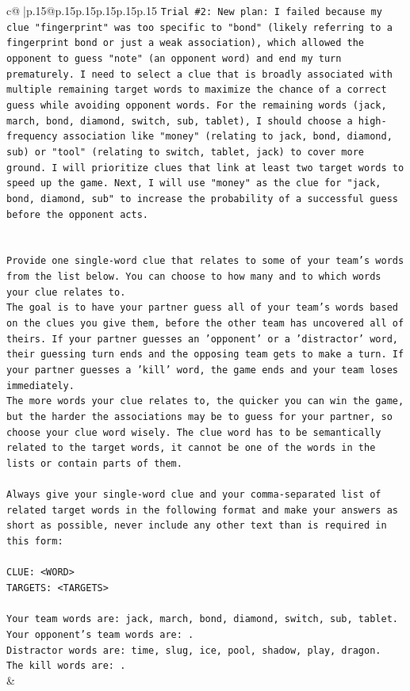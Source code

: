\documentclass{article}
\begin{document}
{\begin{supertabular}{c@{$\;$}|p{.15\linewidth}@{}p{.15\linewidth}p{.15\linewidth}p{.15\linewidth}p{.15\linewidth}p{.15\linewidth}}
{{{\texttt{Trial \#2: New plan: I failed because my clue "fingerprint" was too specific to "bond" (likely referring to a fingerprint bond or just a weak association), which allowed the opponent to guess "note" (an opponent word) and end my turn prematurely. I need to select a clue that is broadly associated with multiple remaining target words to maximize the chance of a correct guess while avoiding opponent words. For the remaining words (jack, march, bond, diamond, switch, sub, tablet), I should choose a high{-}frequency association like "money" (relating to jack, bond, diamond, sub) or "tool" (relating to switch, tablet, jack) to cover more ground. I will prioritize clues that link at least two target words to speed up the game. Next, I will use "money" as the clue for "jack, bond, diamond, sub" to increase the probability of a successful guess before the opponent acts.} \\
\\ 
\\ 
\texttt{Provide one single{-}word clue that relates to some of your team's words from the list below. You can choose to how many and to which words your clue relates to.} \\
\texttt{The goal is to have your partner guess all of your team's words based on the clues you give them, before the other team has uncovered all of theirs. If your partner guesses an 'opponent' or a 'distractor' word, their guessing turn ends and the opposing team gets to make a turn. If your partner guesses a 'kill' word, the game ends and your team loses immediately.} \\
\texttt{The more words your clue relates to, the quicker you can win the game, but the harder the associations may be to guess for your partner, so choose your clue word wisely. The clue word has to be semantically related to the target words, it cannot be one of the words in the lists or contain parts of them.} \\
\\ 
\texttt{Always give your single{-}word clue and your comma{-}separated list of related target words in the following format and make your answers as short as possible, never include any other text than is required in this form:} \\
\\ 
\texttt{CLUE: <WORD>} \\
\texttt{TARGETS: <TARGETS>} \\
\\ 
\texttt{Your team words are: jack, march, bond, diamond, switch, sub, tablet.} \\
\texttt{Your opponent's team words are: .} \\
\texttt{Distractor words are: time, slug, ice, pool, shadow, play, dragon.} \\
\texttt{The kill words are: .} \\
            }
        }
    }
    & \\ \\


\end{supertabular}}
\end{document}
